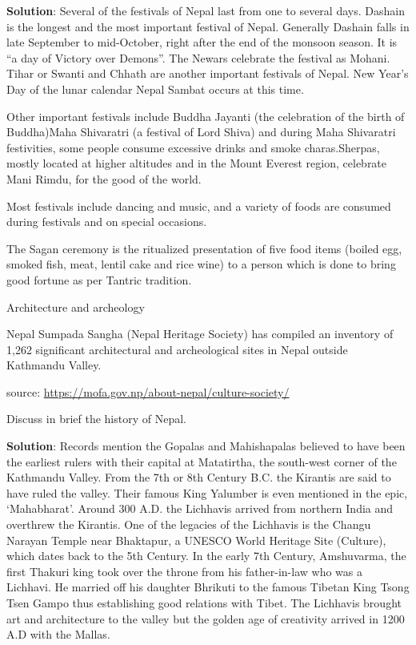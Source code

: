 \documentclass[
  openany]{book}
\newcommand{\question}{\item}
\newenvironment{solution}{ {\bfseries Solution}:}{}
\begin{document}
\begin{questions}
\begin{solution}
Several of the festivals of Nepal last from one to several days. Dashain is the longest and the most important festival of Nepal. Generally Dashain falls in late September to mid-October, right after the end of the monsoon season. It is “a day of Victory over Demons”. The Newars celebrate the festival as Mohani. Tihar or Swanti and Chhath are another important festivals of Nepal. New Year’s Day of the lunar calendar Nepal Sambat occurs at this time.

Other important festivals include Buddha Jayanti (the celebration of the birth of Buddha)Maha Shivaratri (a festival of Lord Shiva) and during Maha Shivaratri festivities, some people consume excessive drinks and smoke charas.Sherpas, mostly located at higher altitudes and in the Mount Everest region, celebrate Mani Rimdu, for the good of the world.

Most festivals include dancing and music, and a variety of foods are consumed during festivals and on special occasions.

The Sagan ceremony is the ritualized presentation of five food items (boiled egg, smoked fish, meat, lentil cake and rice wine) to a person which is done to bring good fortune as per Tantric tradition.

Architecture and archeology

Nepal Sumpada Sangha (Nepal Heritage Society) has compiled an inventory of 1,262 significant architectural and archeological sites in Nepal outside Kathmandu Valley.

source: \url{https://mofa.gov.np/about-nepal/culture-society/}

\end{solution}

\question Discuss in brief the history of Nepal.

\begin{solution}
Records mention the Gopalas and Mahishapalas believed to have been the earliest rulers with their capital at Matatirtha, the south-west corner of the Kathmandu Valley. From the 7th or 8th Century B.C. the Kirantis are said to have ruled the valley. Their famous King Yalumber is even mentioned in the epic, ‘Mahabharat’. Around 300 A.D. the Lichhavis arrived from northern India and overthrew the Kirantis. One of the legacies of the Lichhavis is the Changu Narayan Temple near Bhaktapur, a UNESCO World Heritage Site (Culture), which dates back to the 5th Century. In the early 7th Century, Amshuvarma, the first Thakuri king took over the throne from his father-in-law who was a Lichhavi. He married off his daughter Bhrikuti to the famous Tibetan King Tsong Tsen Gampo thus establishing good relations with Tibet. The Lichhavis brought art and architecture to the valley but the golden age of creativity arrived in 1200 A.D with the Mallas.


\end{solution}
\end{questions}
\end{document}
